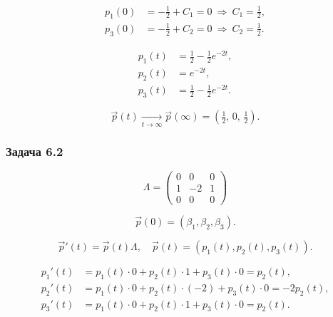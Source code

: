 \[
	\begin{aligned}
		p_1(0) & = -\tfrac{1}{2}+C_1=0 \ \Rightarrow\ C_1=\tfrac{1}{2}, \\
		p_3(0) & = -\tfrac{1}{2}+C_2=0 \ \Rightarrow\ C_2=\tfrac{1}{2}.
	\end{aligned}
\]

\[
	\begin{aligned}
		p_1(t) & = \tfrac{1}{2}-\tfrac{1}{2}e^{-2t}, \\
		p_2(t) & = e^{-2t},                          \\
		p_3(t) & = \tfrac{1}{2}-\tfrac{1}{2}e^{-2t}.
	\end{aligned}
\]

\[
	\vec{p}(t)\xrightarrow[t\to\infty]{}\vec{p}(\infty)=\left(\tfrac{1}{2},\,0,\,\tfrac{1}{2}\right).
\]

\subsubsection*{Задача 6.2}



\[
	\Lambda =
	\begin{pmatrix}
		0 & 0  & 0 \\
		1 & -2 & 1 \\
		0 & 0  & 0
	\end{pmatrix}
\]


\[
	\vec{p}(0) = (\beta_1,\beta_2,\beta_3).
\]

\[
	\vec{p}'(t) = \vec{p}(t)\Lambda,\quad \vec{p}(t)=(p_1(t),p_2(t),p_3(t)).
\]

\[
	\begin{aligned}
		p_1'(t) & = p_1 (t)\cdot 0 + p_2(t)\cdot 1 + p_3(t)\cdot 0 = p_2(t),     \\
		p_2'(t) & = p_1 (t)\cdot 0 + p_2(t)\cdot(-2) + p_3(t)\cdot 0 = -2p_2(t), \\
		p_3'(t) & = p_1 (t)\cdot 0 + p_2(t)\cdot 1 + p_3(t)\cdot 0 = p_2(t).
	\end{aligned}
\]

